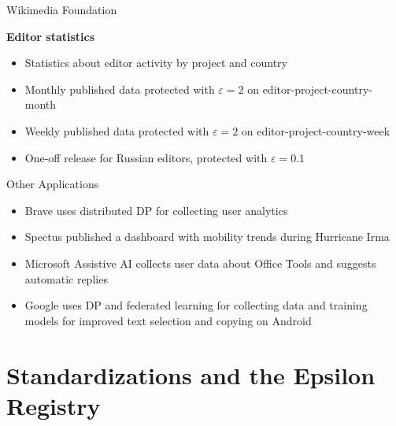 \documentclass[12pt,aspectratio=169,handout]{beamer}
\begin{document}
\begin{frame}{Wikimedia Foundation}

\textbf{Editor statistics} \vskip2mm

\begin{itemize} \setlength\itemsep{2mm}
%
\item Statistics about editor activity by project and country \vskip2mm
%
\item Monthly published data protected with $\varepsilon = 2$ on editor-project-country-month
%
\item Weekly published data protected with $\varepsilon = 2$ on editor-project-country-week
%
\item One-off release for Russian editors, protected with $\varepsilon = 0.1$ 
%
\end{itemize}

\end{frame}


\begin{frame}{Other Applications}

\begin{itemize} \setlength\itemsep{2mm}
%
\item Brave uses distributed DP for collecting user analytics
%
\item Spectus published a dashboard with mobility trends during Hurricane Irma
%
\item Microsoft Assistive AI collects user data about Office Tools and suggests automatic replies
%
\item Google uses DP and federated learning for collecting data and training models for improved text selection and copying on Android
%
\end{itemize}

\end{frame}


\section{Standardizations and the Epsilon Registry}

\end{document}
